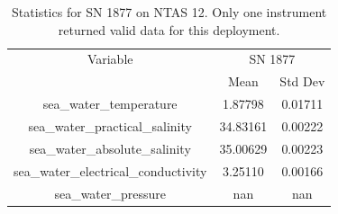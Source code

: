 \begin{table}[h]
\centering
\begin{tabular}{|c|c|c|}
\hline
Variable & \multicolumn{2}{c|}{SN 1877} \\
& Mean & Std Dev \\
\hline
sea\_water\_temperature & 1.87798 & 0.01711 \\
sea\_water\_practical\_salinity & 34.83161 & 0.00222 \\
sea\_water\_absolute\_salinity & 35.00629 & 0.00223 \\
sea\_water\_electrical\_conductivity & 3.25110 & 0.00166 \\
sea\_water\_pressure & nan & nan \\
\hline
\end{tabular}
\caption{Statistics for SN 1877 on NTAS 12. Only one instrument returned valid data for this deployment.}
\end{table}
